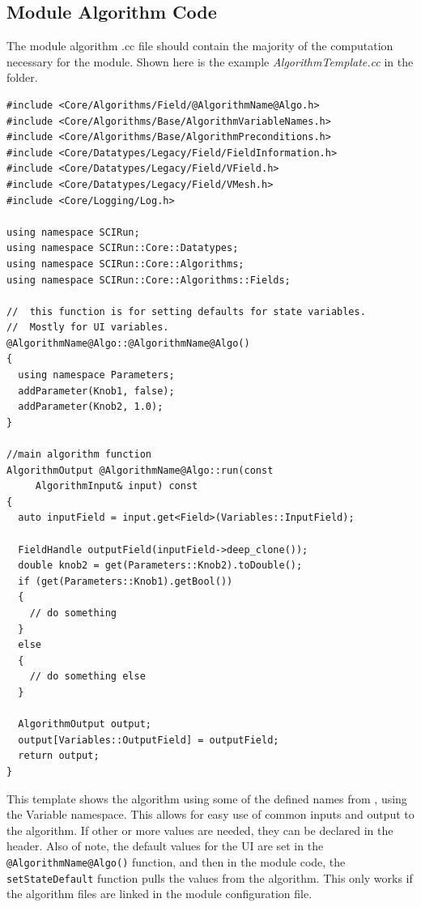 \documentclass[fleqn,11pt,openany]{book}
\begin{document}
\subsection{Module Algorithm Code}

The module algorithm .cc file should contain the majority of the computation necessary for the module.
Shown here is the example \emph{AlgorithmTemplate.cc} in the \emph{} folder.
\begin{verbatim}
#include <Core/Algorithms/Field/@AlgorithmName@Algo.h>
#include <Core/Algorithms/Base/AlgorithmVariableNames.h>
#include <Core/Algorithms/Base/AlgorithmPreconditions.h>
#include <Core/Datatypes/Legacy/Field/FieldInformation.h>
#include <Core/Datatypes/Legacy/Field/VField.h>
#include <Core/Datatypes/Legacy/Field/VMesh.h>
#include <Core/Logging/Log.h>

using namespace SCIRun;
using namespace SCIRun::Core::Datatypes;
using namespace SCIRun::Core::Algorithms;
using namespace SCIRun::Core::Algorithms::Fields;

//  this function is for setting defaults for state variables.  
//  Mostly for UI variables. 
@AlgorithmName@Algo::@AlgorithmName@Algo()
{
  using namespace Parameters;
  addParameter(Knob1, false);
  addParameter(Knob2, 1.0);
}

//main algorithm function
AlgorithmOutput @AlgorithmName@Algo::run(const 
     AlgorithmInput& input) const
{
  auto inputField = input.get<Field>(Variables::InputField);
  
  FieldHandle outputField(inputField->deep_clone());
  double knob2 = get(Parameters::Knob2).toDouble();
  if (get(Parameters::Knob1).getBool())
  {
    // do something
  }
  else
  {
    // do something else
  }

  AlgorithmOutput output;
  output[Variables::OutputField] = outputField;
  return output;
}
\end{verbatim}

This template shows the algorithm using some of the defined names from \emph{}, using the Variable namespace.
This allows for easy use of common inputs and output to the algorithm.  
If other or more values are needed, they can be declared in the header.  
Also of note, the default values for the UI are set in the \verb|@AlgorithmName@Algo()| function, and then in the module code, the \verb|setStateDefault| function pulls the values from the algorithm.  
This only works if the algorithm files are linked in the module configuration file. 
\end{document}
